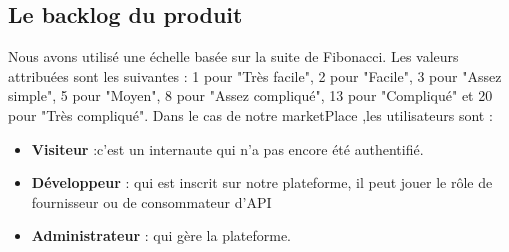     \subsection{Le backlog du produit  } 
    Nous avons utilisé une échelle basée sur la suite de Fibonacci. Les valeurs attribuées sont les suivantes  : 1 pour "Très facile", 2 pour "Facile", 3 pour "Assez simple", 5 pour "Moyen", 8 pour "Assez compliqué", 13 pour "Compliqué" et 20 pour "Très compliqué". Dans le cas de notre marketPlace ,les utilisateurs sont : \\
    \begin{itemize}
        \item \textbf{Visiteur }:c’est un internaute qui n'a pas encore été authentifié.
        \item \textbf{Développeur  }: qui est inscrit sur notre plateforme, il peut jouer le rôle de fournisseur ou de consommateur d’API
        \item \textbf{Administrateur }: qui gère la plateforme.
    \end{itemize} 

